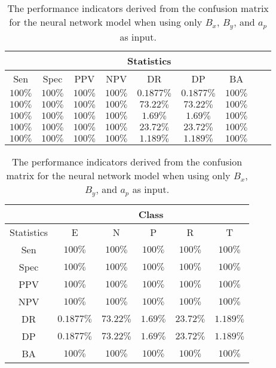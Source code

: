\begin{table}[!ht]
	\centering
	\begin{tabular}{|c|c|c|c|c|c|c|c|c|}
		\hline
		 & \multicolumn{7}{c|}{Statistics} \\ \hline
		Sen & Spec & PPV & NPV & DR & DP & BA \\ \hline
		$100\%$ & $100\%$ & $100\%$ & $100\%$ & $0.1877\%$ & $0.1877\%$ & $100\%$ \\ \hline
		$100\%$ & $100\%$ & $100\%$ & $100\%$ & $73.22\%$ & $73.22\%$ & $100\%$ \\ \hline
		$100\%$ & $100\%$ & $100\%$ & $100\%$ & $1.69\%$ & $1.69\%$ & $100\%$ \\ \hline
		$100\%$ & $100\%$ & $100\%$ & $100\%$ & $23.72\%$ & $23.72\%$ & $100\%$ \\ \hline
		$100\%$ & $100\%$ & $100\%$ & $100\%$ & $1.189\%$ & $1.189\%$ & $100\%$ \\ \hline
	\end{tabular}
	\caption{The performance indicators derived from the confusion matrix for the neural network model when using only $B_{x}$, $B_{y}$, and $a_{p}$ as input.}
	\label{tab:cs:xyap:nnet}
\end{table}

\begin{table}[!ht]
	\centering
	\begin{tabular}{|c|c|c|c|c|c|}
		\hline
		 & \multicolumn{5}{c|}{Class} \\ \hline
		Statistics & E & N & P & R & T \\ \hline
		Sen & $100\%$ & $100\%$ & $100\%$ & $100\%$ & $100\%$ \\ \hline
		Spec & $100\%$ & $100\%$ & $100\%$ & $100\%$ & $100\%$ \\ \hline
		PPV & $100\%$ & $100\%$ & $100\%$ & $100\%$ & $100\%$ \\ \hline
		NPV & $100\%$ & $100\%$ & $100\%$ & $100\%$ & $100\%$ \\ \hline
		DR & $0.1877\%$ & $73.22\%$ & $1.69\%$ & $23.72\%$ & $1.189\%$ \\ \hline
		DP & $0.1877\%$ & $73.22\%$ & $1.69\%$ & $23.72\%$ & $1.189\%$ \\ \hline
		BA & $100\%$ & $100\%$ & $100\%$ & $100\%$ & $100\%$ \\ \hline
	\end{tabular}
	\caption{The performance indicators derived from the confusion matrix for the neural network model when using only $B_{x}$, $B_{y}$, and $a_{p}$ as input.}
	\label{tab:cs:reverse:xyap:nnet}
\end{table}

